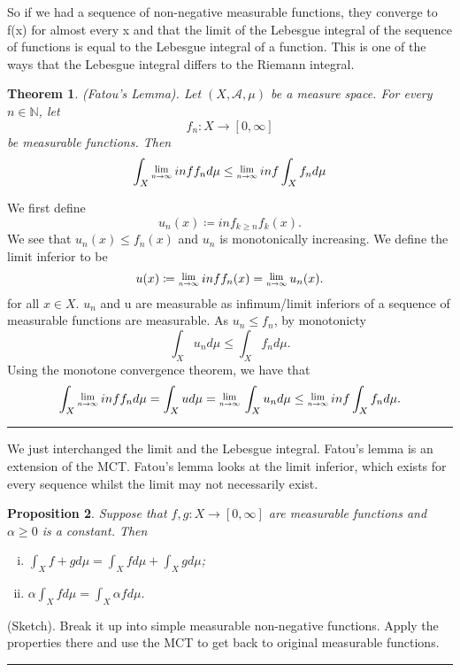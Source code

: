 \documentclass[twoside]{article}
\newcounter{lecnum}
\newcommand{\Lim}[1]{\raisebox{0.5ex}{\scalebox{0.8}{$\displaystyle \lim_{#1}\;$}}}
\newtheorem{theorem}{Theorem}[lecnum]
\newtheorem{proposition}[theorem]{Proposition}
\newenvironment{proof}{{\bf Proof:}}{\hfill\rule{2mm}{2mm}}
\begin{document}
So if we had a sequence of non-negative measurable functions, they converge to f(x) for almost every x and that the limit of the Lebesgue integral of the sequence of functions is equal to the Lebesgue integral of a function. This is one of the ways that the Lebesgue integral differs to the Riemann integral.


\begin{theorem}
(Fatou's Lemma). Let $(X, \mathcal{A}, \mu)$ be a measure space. For every $n \in \mathbb{N}$, let
$$
f_n: X \rightarrow [0, \infty]
$$
be measurable functions. Then
$$
\int_X\Lim{n \rightarrow \infty}inf f_n d\mu \leq \Lim{n \rightarrow \infty} inf \int_Xf_n d\mu
$$
\end{theorem}

\begin{proof}
We first define 
$$
u_n(x) \coloneqq inf_{k \geq n}f_k(x).
$$
We see that $u_n(x) \leq f_n(x)$ and $u_n$ is monotonically increasing. We define the limit inferior to be
$$
u(x) \coloneqq \Lim{n \rightarrow \infty}inf f_n(x) = \Lim{n \rightarrow \infty}u_n(x).
$$
for all $x \in X$. $u_n$ and u are measurable as infimum/limit inferiors of a sequence of measurable functions are measurable. As $u_n \leq f_n$, by monotonicty
$$
\int_X u_n d\mu \leq \int_X f_n d\mu.
$$
Using the monotone convergence theorem, we have that 
$$
\int_X \Lim{n \rightarrow \infty}inf f_n d\mu = \int_X u d\mu = \Lim{n \rightarrow \infty}\int_X u_n d\mu \leq \Lim{n \rightarrow \infty}inf \int_X f_n d\mu.
$$
\end{proof}

We just interchanged the limit and the Lebesgue integral. Fatou's lemma is an extension of the MCT. Fatou's lemma looks at the limit inferior, which exists for every sequence whilst the limit may not necessarily exist.


\begin{proposition}
Suppose that $f, g: X \rightarrow [0, \infty]$ are measurable functions and $\alpha \geq 0$ is a constant. Then
\begin{enumerate}[(i)]
    \item $\int_Xf + g d\mu = \int_X f d\mu + \int_X g d\mu$;
    \item $\alpha \int_Xf d\mu = \int_X\alpha f d\mu$.
\end{enumerate}
\end{proposition}

\begin{proof}
(Sketch). Break it up into simple measurable non-negative functions. Apply the properties there and use the MCT to get back to original measurable functions.  
\end{proof}
\end{document}
